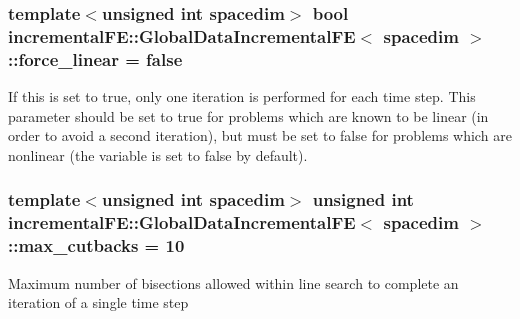 \subsubsection[{\texorpdfstring{force\+\_\+linear}{force_linear}}]{\setlength{\rightskip}{0pt plus 5cm}template$<$unsigned int spacedim$>$ bool {\bf incremental\+F\+E\+::\+Global\+Data\+Incremental\+FE}$<$ spacedim $>$\+::force\+\_\+linear = false\hspace{0.3cm}{\ttfamily [private]}}\hypertarget{classincremental_f_e_1_1_global_data_incremental_f_e_a37c1d42902e74f13f3c4ba82d2dabd67}{}\label{classincremental_f_e_1_1_global_data_incremental_f_e_a37c1d42902e74f13f3c4ba82d2dabd67}
If this is set to {\ttfamily true}, only one iteration is performed for each time step. This parameter should be set to {\ttfamily true} for problems which are known to be linear (in order to avoid a second iteration), but must be set to {\ttfamily false} for problems which are nonlinear (the variable is set to {\ttfamily false} by default). 
\subsubsection[{\texorpdfstring{max\+\_\+cutbacks}{max_cutbacks}}]{\setlength{\rightskip}{0pt plus 5cm}template$<$unsigned int spacedim$>$ unsigned int {\bf incremental\+F\+E\+::\+Global\+Data\+Incremental\+FE}$<$ spacedim $>$\+::max\+\_\+cutbacks = 10\hspace{0.3cm}{\ttfamily [private]}}\hypertarget{classincremental_f_e_1_1_global_data_incremental_f_e_a7ae58573e9cc241a14976bf19351ba63}{}\label{classincremental_f_e_1_1_global_data_incremental_f_e_a7ae58573e9cc241a14976bf19351ba63}
Maximum number of bisections allowed within line search to complete an iteration of a single time step 
